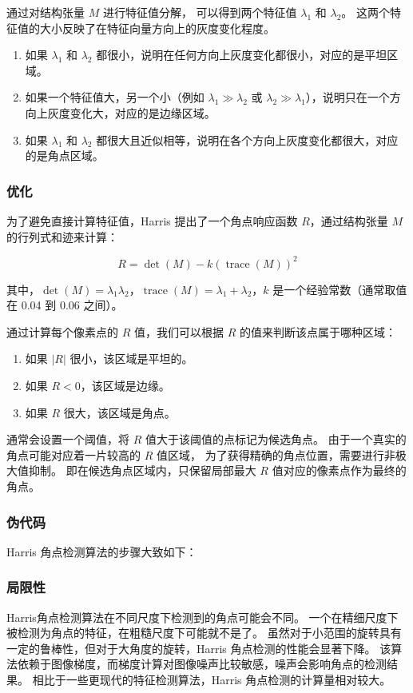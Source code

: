 通过对结构张量 \(M\) 进行特征值分解，
可以得到两个特征值 \(\lambda_1\) 和 \(\lambda_2\)。
这两个特征值的大小反映了在特征向量方向上的灰度变化程度。

\begin{enumerate}
    \item 如果 \(\lambda_1\) 和 \(\lambda_2\) 都很小，说明在任何方向上灰度变化都很小，对应的是平坦区域。
    \item 如果一个特征值大，另一个小（例如 \(\lambda_1 \gg \lambda_2\) 或 \(\lambda_2 \gg \lambda_1\)），说明只在一个方向上灰度变化大，对应的是边缘区域。
    \item 如果 \(\lambda_1\) 和 \(\lambda_2\) 都很大且近似相等，说明在各个方向上灰度变化都很大，对应的是角点区域。
\end{enumerate}

\subsubsection{优化}
为了避免直接计算特征值，Harris 提出了一个角点响应函数 \(R\)，通过结构张量 \(M\) 的行列式和迹来计算：
    
\[ R = \det(M) - k (\operatorname{trace}(M))^2 \]

其中，\(\det(M) = \lambda_1 \lambda_2\)，\(\operatorname{trace}(M) = \lambda_1 + \lambda_2\)，\(k\) 是一个经验常数（通常取值在 0.04 到 0.06 之间）。

通过计算每个像素点的 \(R\) 值，我们可以根据 \(R\) 的值来判断该点属于哪种区域：
\begin{enumerate}
    \item 如果 \(|R|\) 很小，该区域是平坦的。
    \item 如果 \(R < 0\)，该区域是边缘。
    \item 如果 \(R\) 很大，该区域是角点。
\end{enumerate}

通常会设置一个阈值，将 \(R\) 值大于该阈值的点标记为候选角点。
由于一个真实的角点可能对应着一片较高的 \(R\) 值区域，
为了获得精确的角点位置，需要进行非极大值抑制。
即在候选角点区域内，只保留局部最大 \(R\) 值对应的像素点作为最终的角点。

\subsubsection{伪代码}
Harris 角点检测算法的步骤大致如下：


\subsubsection{局限性}
Harris角点检测算法在不同尺度下检测到的角点可能会不同。
一个在精细尺度下被检测为角点的特征，在粗糙尺度下可能就不是了。
虽然对于小范围的旋转具有一定的鲁棒性，但对于大角度的旋转，Harris 角点检测的性能会显著下降。
该算法依赖于图像梯度，而梯度计算对图像噪声比较敏感，噪声会影响角点的检测结果。
相比于一些更现代的特征检测算法，Harris 角点检测的计算量相对较大。